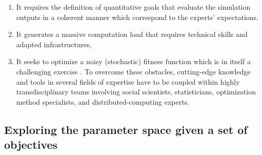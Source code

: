 \begin{enumerate}[label=(\arabic*),labelindent=0pt, leftmargin=*]
 \item It requires the definition of quantitative goals that evaluate the simulation outputs in a coherent manner which correspond to the experts’ expectations. \item It generates a massive computation load that requires technical skills and adapted infrastructures, \item It seeks to optimize a noisy (stochastic) fitness function which is in itself a challenging exercise \autocite{Pietro2004}. To overcome these obstacles, cutting-edge knowledge and tools in several fields of expertise have to be coupled within highly transdisciplinary teams involving social scientists, statisticians, optimization method specialists, and distributed-computing experts.\end{enumerate}

\subsection{Exploring the parameter space given a set of objectives}
\label{subsec:exploring}

